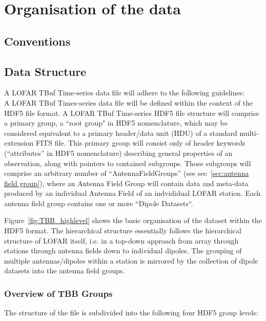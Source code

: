 \documentclass[a4paper,10pt,bibtotoc]{scrartcl}
\begin{document}
\section{Organisation of the data}
\label{sec:structure}

\subsection{Conventions}






\subsection{Data Structure}

A LOFAR TBuf Time-series data file will adhere to the following guidelines:\\

A LOFAR TBuf Times-series data file will be defined within the context
of the HDF5 file format.  A LOFAR TBuf Time-series HDF5 file structure
will comprise a primary group, a ``root group" in HDF5 nomenclature,
which may be considered equivalent to a primary header/data unit (HDU)
of a standard multi-extension FITS file.  This primary group will
consist only of header keywords (“attributes” in HDF5 nomenclature)
describing general properties of an observation, along with pointers
to contained subgroups.  Those subgroups will comprise an arbitrary
number of ``AntennaFieldGroups'' (see sec~\ref{sec:antenna field group}), where an
Antenna Field Group will contain data and meta-data produced by an
individual Antenna Field of an indvididual LOFAR station. Each antenna field group contains one or more ``Dipole Datasets``.

Figure~\ref{fig:TBB_highlevel} shows the basic organisation of the dataset within
the HDF5 format. The hierarchical structure essentially follows the
hierarchical structure of LOFAR itself, i.e. in a top-down approach
from array through stations through antenna fields down to individual dipoles. The grouping
of multiple antennas/dipoles within a station is mirrored by the
collection of dipole datasets into the antenna field groups.

\subsubsection{Overview of TBB Groups}

The structure of the file is subdivided into the following four HDF5 group levels:
\end{document}
